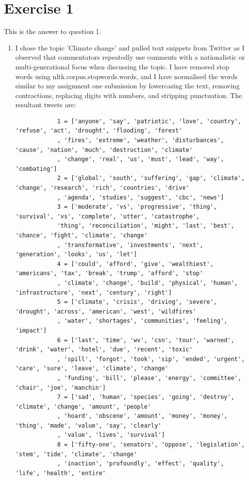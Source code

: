 \documentclass{article}
\date{}
\begin{document}
	
\section{Exercise 1}
This is the answer to question 1.
\begin{enumerate}
	
	\item I chose the topic 'Climate change' and pulled text snippets from Twitter as I observed that commentators repeatedly use comments with a nationalistic or multi-generational focus when discussing the topic. I have removed stop words using nltk.corpus.stopwords.words, and I have normalised the words similar to my assignment one submission by lowercasing the text, removing contractions, replacing digits with numbers, and stripping punctuation. The resultant tweets are:
		\begin{verbatim}
			1 = ['anyone', 'say', 'patriotic', 'love', 'country', 'refuse', 'act', 'drought', 'flooding', 'forest'
			, 'fires', 'extreme', 'weather', 'disturbances', 'cause', 'nation', 'much', 'destruction', 'climate'
			, 'change', 'real', 'us', 'must', 'lead', 'way', 'combating']
			2 = ['global', 'south', 'suffering', 'gap', 'climate', 'change', 'research', 'rich', 'countries', 'drive'
			, 'agenda', 'studies', 'suggest', 'cbc', 'news']
			3 = ['moderate', 'vs', 'progressive', 'thing', 'survival', 'vs', 'complete', 'utter', 'catastrophe', 
			'thing', 'reconciliation', 'might', 'last', 'best', 'chance', 'fight', 'climate', 'change'
			, 'transformative', 'investments', 'next', 'generation', 'looks', 'us', 'let']
			4 = ['could', 'afford', 'give', 'wealthiest', 'americans', 'tax', 'break', 'trump', 'afford', 'stop'
			, 'climate', 'change', 'build', 'physical', 'human', 'infrastructure', 'next', 'century', 'right']
			5 = ['climate', 'crisis', 'driving', 'severe', 'drought', 'across', 'american', 'west', 'wildfires'
			, 'water', 'shortages', 'communities', 'feeling', 'impact']
			6 = ['last', 'time', 'wv', 'csn', 'tour', 'warned', 'drink', 'water', 'hotel', 'due', 'recent', 'toxic'
			, 'spill', 'forgot', 'took', 'sip', 'ended', 'urgent', 'care', 'sure', 'leave', 'climate', 'change'
			, 'funding', 'bill', 'please', 'energy', 'committee', 'chair', 'joe', 'manchin']
			7 = ['sad', 'human', 'species', 'going', 'destroy', 'climate', 'change', 'amount', 'people'
			, 'hoard', 'obscene', 'amount', 'money', 'money', 'thing', 'made', 'value', 'say', 'clearly'
			, 'value', 'lives', 'survival']
			8 = ['fifty-one', 'senators', 'oppose', 'legislation', 'stem', 'tide', 'climate', 'change'
			, 'inaction', 'profoundly', 'effect', 'quality', 'life', 'health', 'entire'

\end{verbatim}
\end{enumerate}
\end{document}
